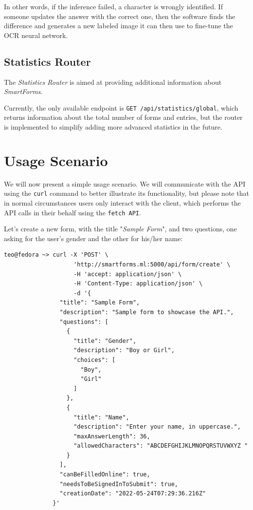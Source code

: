 \documentclass[12pt, a4paper]{report}
\def\code#1{\texttt{#1}}
\begin{document}
In other words, if the inference failed, a character is wrongly identified. If someone updates the answer with the correct one, then the software finds the difference and generates a new labeled image it can then use to fine-tune the OCR neural network.

\subsection{Statistics Router}

The \textit{Statistics Router} is aimed at providing additional information about \textit{SmartForms}.

Currently, the only available endpoint is \code{GET /api/statistics/global}, which returns information about the total number of forms and entries, but the router is implemented to simplify adding more advanced statistics in the future.

\section{Usage Scenario}

We will now present a simple usage scenario. We will communicate with the API using the \code{curl} command to better illustrate its functionality, but please note that in normal circumstances users only interact with the client, which performs the API calls in their behalf using the \code{fetch API}.

Let's create a new form, with the title "\textit{Sample Form}", and two questions, one asking for the user's gender and the other for his/her name:

\begin{verbatim}
teo@fedora ~> curl -X 'POST' \
                    'http://smartforms.ml:5000/api/form/create' \
                    -H 'accept: application/json' \
                    -H 'Content-Type: application/json' \
                    -d '{
                "title": "Sample Form",
                "description": "Sample form to showcase the API.",
                "questions": [
                  {
                    "title": "Gender",
                    "description": "Boy or Girl",
                    "choices": [
                      "Boy",
                      "Girl"
                    ]
                  },
                  {
                    "title": "Name",
                    "description": "Enter your name, in uppercase.",
                    "maxAnswerLength": 36,
                    "allowedCharacters": "ABCDEFGHIJKLMNOPQRSTUVWXYZ "
                  }
                ],
                "canBeFilledOnline": true,
                "needsToBeSignedInToSubmit": true,
                "creationDate": "2022-05-24T07:29:36.216Z"
              }'
\end{verbatim}
\end{document}
